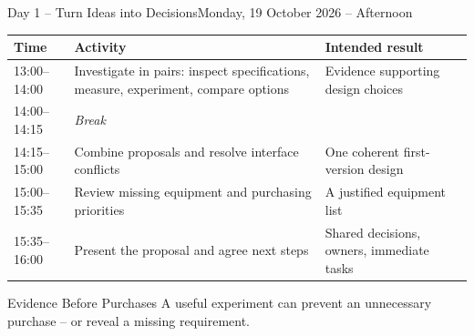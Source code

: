 \begin{frame}{Day 1 -- Turn Ideas into Decisions}{Monday, 19 October 2026 -- Afternoon}
\small\renewcommand{\arraystretch}{1.45}
\par\noindent\begin{tabularx}{\textwidth}{@{}l>{\raggedright\arraybackslash}X >{\raggedright\arraybackslash}p{}@{}}
\toprule
\textbf{Time} & \textbf{Activity} & \textbf{Intended result}\\\midrule
13:00--14:00 & Investigate in pairs: inspect specifications, measure, experiment, compare options & Evidence supporting design choices\\
14:00--14:15 & \textit{Break} & \\
14:15--15:00 & Combine proposals and resolve interface conflicts & One coherent first-version design\\
15:00--15:35 & Review missing equipment and purchasing priorities & A justified equipment list\\
15:35--16:00 & Present the proposal and agree next steps & Shared decisions, owners, immediate tasks\\\bottomrule
\end{tabularx}\par
\begin{alertblock}{Evidence Before Purchases}
A useful experiment can prevent an unnecessary purchase -- or reveal a missing requirement.
\end{alertblock}
\end{frame}

